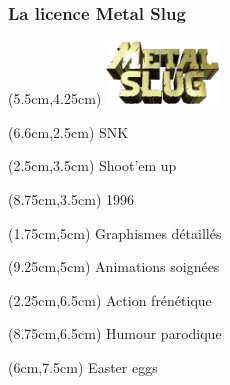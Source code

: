 \begin{frame}
	
	\frametitle{La licence Metal Slug}
	
	\begin{textblock*}{3cm}(5.5cm,4.25cm)
		\includegraphics[width=3cm]{figures/logo_metal_slug.png}
	\end{textblock*}
	
	
	{
		\begin{textblock*}{5cm}(6.6cm,2.5cm)
			SNK
		\end{textblock*}
		\begin{textblock*}{5cm}(2.5cm,3.5cm)
			Shoot'em up
		\end{textblock*}
		\begin{textblock*}{5cm}(8.75cm,3.5cm)
			1996
		\end{textblock*}
		\begin{textblock*}{5cm}(1.75cm,5cm)
			Graphismes détaillés
		\end{textblock*}
		\begin{textblock*}{5cm}(9.25cm,5cm)
			Animations soignées
		\end{textblock*}
		\begin{textblock*}{5cm}(2.25cm,6.5cm)
			Action frénétique
		\end{textblock*}
		\begin{textblock*}{5cm}(8.75cm,6.5cm)
			Humour parodique
		\end{textblock*}
		\begin{textblock*}{5cm}(6cm,7.5cm)
			Easter eggs
		\end{textblock*}
	}
\end{frame}
